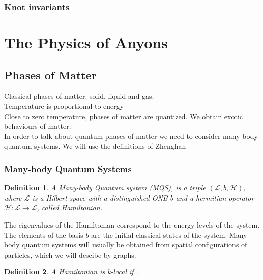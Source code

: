 \documentclass{article}
\newtheorem{definition}{Definition}
\begin{document}
\subsubsection{Knot invariants}


\section{The Physics of Anyons}


\subsection{Phases of Matter}
Classical phases of matter: solid, liquid and gas.\\
Temperature is proportional to energy \\
Close to zero temperature, phases of matter are quantized. We obtain exotic behaviours of matter.\\
In order to talk about quantum phases of matter we need to consider many-body quantum systems. We will use the definitions of Zhenghan

\subsubsection{Many-body Quantum Systems}
\begin{definition}
A Many-body Quantum system (MQS), is a triple $(\mathcal{L}, b, \mathcal{H})$, where $\mathcal{L}$ is a Hilbert space with a distinguished ONB $b$ and a hermitian operator $\mathcal{H}: \mathcal{L} \rightarrow \mathcal{L}$, called Hamiltonian.
\end{definition}
The eigenvalues of the Hamiltonian correspond to the energy levels of the system. The elements of the basis $b$ are the initial classical states of the system. Many-body quantum systems will usually be obtained from spatial configurations of particles, which we will descibe by graphs.
\begin{definition}
A Hamiltonian is k-local if...
\end{definition}
\end{document}
